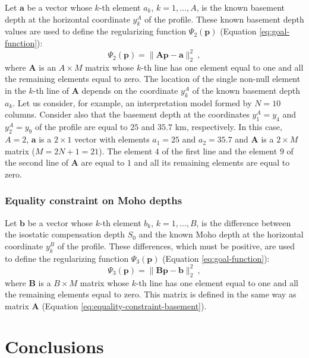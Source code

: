 \documentclass[manuscript]{geophysics}
\begin{document}
Let $\mathbf{a}$ be a vector whose $k$-th element $a_{k}$,
$k = 1, \dots, A$, is the known basement depth at the horizontal coordinate
$y^{A}_{k}$ of the profile. These known basement depth values are used to define 
the regularizing function $\Psi_{2}(\mathbf{p})$ 
(Equation \ref{eq:goal-function}):
\begin{equation}
\Psi_{2}(\mathbf{p}) = \| \mathbf{A}\mathbf{p} - \mathbf{a} \|_{2}^{2} \: ,
\label{eq:equality-constraint-basement}
\end{equation}
where $\mathbf{A}$ is an $A \times M$ matrix whose $k$-th line has one element 
equal to one and all the remaining elements equal to zero. The location of the
single non-null element in the $k$-th line of $\mathbf{A}$ depends on the coordinate
$y^{A}_{k}$ of the known basement depth $a_{k}$. Let us consider, 
for example, an interpretation model formed by $N = 10$ columns. Consider also that 
the basement depth at the coordinates $y^{A}_{1} = y_{4}$ and $y^{A}_{2} = y_{9}$ of
the profile are equal to $25$ and $35.7$ km, respectively. In this case, $A = 2$,
$\mathbf{a}$ is a $2 \times 1$ vector with elements $a_{1} = 25$ and $a_{2} = 35.7$
and $\mathbf{A}$ is a $2 \times M$ matrix ($M = 2N + 1 = 21$). The element $4$ of the
first line and the element $9$ of the second line of $\mathbf{A}$ are equal to $1$ and
all its remaining elements are equal to zero.

\subsubsection*{Equality constraint on Moho depths}

Let $\mathbf{b}$ be a vector whose $k$-th element $b_{k}$,
$k = 1, \dots, B$, is the difference between the isostatic compensation depth
$S_{0}$ and the known Moho depth at the horizontal coordinate $y^{B}_{k}$ of the
profile. These differences, which must be positive, are used to define the 
regularizing function $\Psi_{3}(\mathbf{p})$ (Equation \ref{eq:goal-function}):
\begin{equation}
\Psi_{3}(\mathbf{p}) = \| \mathbf{B}\mathbf{p} - \mathbf{b} \|_{2}^{2} \: ,
\label{eq:equality-constraint-moho}
\end{equation}
where $\mathbf{B}$ is a $B \times M$ matrix whose $k$-th line has one element 
equal to one and all the remaining elements equal to zero. This matrix is defined 
in the same way as matrix $\mathbf{A}$ (Equation \ref{eq:equality-constraint-basement}).


\section{Conclusions}
\end{document}
